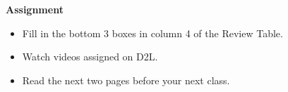\begin{center}
  {\large\bf Assignment}
\end{center}

\begin{itemize}
\item Fill in the bottom 3 boxes in column 4 of the Review Table. 
\item Watch videos assigned on D2L.
\item Read the next two pages before your next class.
\end{itemize}
